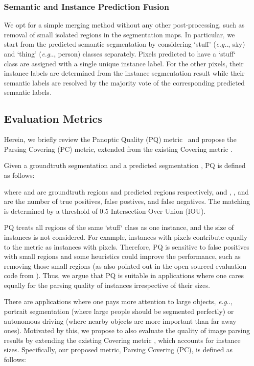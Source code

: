\documentclass[10pt,twocolumn,letterpaper]{article}
\makeatletter
\def\@onedot{\ifx\@let@token.\else.\null\fi\xspace}
\DeclareRobustCommand\onedot{\futurelet\@let@token\@onedot}
\def\eg{\emph{e.g}\onedot} \def\Eg{\emph{E.g}\onedot}
\makeatother
\begin{document}
\subsubsection{Semantic and Instance Prediction Fusion}
\label{sec:fuse_semantic_instance}
We opt for a simple merging method without any other post-processing, such as removal of small isolated regions in the segmentation maps. In particular, we start from the predicted semantic segmentation by considering `stuff' (\eg, sky) and `thing' (\eg, person) classes separately. Pixels predicted to have a `stuff` class are assigned with a single unique instance label. For the other pixels, their instance labels are determined from the instance segmentation result while their semantic labels are resolved by the majority vote of the corresponding predicted semantic labels.

\subsection{Evaluation Metrics}

Herein, we briefly review the Panoptic Quality (PQ) metric~\cite{kirillov2018panoptic} and propose the Parsing Covering (PC) metric, extended from the existing Covering metric \cite{amfm_pami2011}.

Given a groundtruth segmentation  and a predicted segmentation , PQ is defined as follows:


where  and  are groundtruth regions and predicted regions respectively, and , , and  are the number of true positives, false postives, and false negatives. The matching is determined by a threshold of 0.5 Intersection-Over-Union (IOU).

PQ treats all regions of the same `stuff` class as one instance, and the size of instances is not considered. For example, instances with  pixels contribute equally to the metric as instances with  pixels. Therefore, PQ is sensitive to false positives with small regions and some heuristics could improve the performance, such as removing those small regions (as also pointed out in the open-sourced evaluation code from \cite{kirillov2018panoptic}). Thus, we argue that PQ is suitable in applications where one cares equally for the parsing quality of instances irrespective of their sizes.

There are applications where one pays more attention to large objects, \eg, portrait segmentation (where large people should be segmented perfectly) or autonomous driving (where nearby objects are more important than far away ones). Motivated by this, we propose to also evaluate the quality of image parsing results by extending the existing Covering metric \cite{amfm_pami2011}, which accounts for instance sizes. Specifically, our proposed metric, Parsing Covering (PC), is defined as follows:
 
\end{document}
